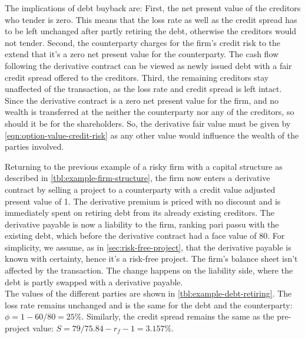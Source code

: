 \documentclass[../main.tex]{subfiles}
\begin{document}
            The implications of debt buyback are: 
            First, the net present value of the creditors who tender is zero. 
            This means that the loss rate as well as the credit spread has to be left unchanged
            after partly retiring the debt, otherwise the creditors would not tender. 
            Second, the counterparty charges for the firm's credit risk 
            to the extend that it's a zero net present value for the counterparty. 
            The cash flow following the derivative contract can be viewed as newly issued debt
            with a fair credit spread offered to the creditors.
            Third, the remaining creditors stay unaffected of the transaction, 
            as the loss rate and credit spread is left intact. 
            Since the derivative contract is a zero net present value for the firm, 
            and no wealth is transferred at the neither the counterparty nor any of the creditors, 
            so should it be for the shareholders. 
            So, the derivative fair value must be given by \cref{eqn:option-value-credit-risk} 
            as any other value would influence the wealth of the parties involved.

            Returning to the previous example of a risky firm with a capital structure
            as described in \cref{tbl:example-firm-structure}, 
            the firm now enters a derivative contract by selling a project to a counterparty
            with a credit value adjusted present value of 1. 
            The derivative premium is priced with no discount 
            and is immediately spent on retiring debt from its already existing creditors. 
            The derivative payable is now a liability to the firm, ranking pari passu with the existing debt, 
            which before the derivative contract had a face value of 80. 
            For simplicity, we assume, as in \cref{sec:risk-free-project},
            that the derivative payable is known with certainty, hence it's a risk-free project. 
            The firm's balance sheet isn't affected by the transaction. 
            The change happens on the liability side, where the debt is partly swapped with a derivative payable.\\
            The values of the different parties are shown in \cref{tbl:example-debt-retiring}. 
            The loss rate remains unchanged and is the same for the debt and the counterparty: $\phi=1-60/80=25\%$. 
            Similarly, the credit spread remains the same as the pre-project value: $S=79/75.84-r_{f}-1=3.157\%$.
            
\end{document}
